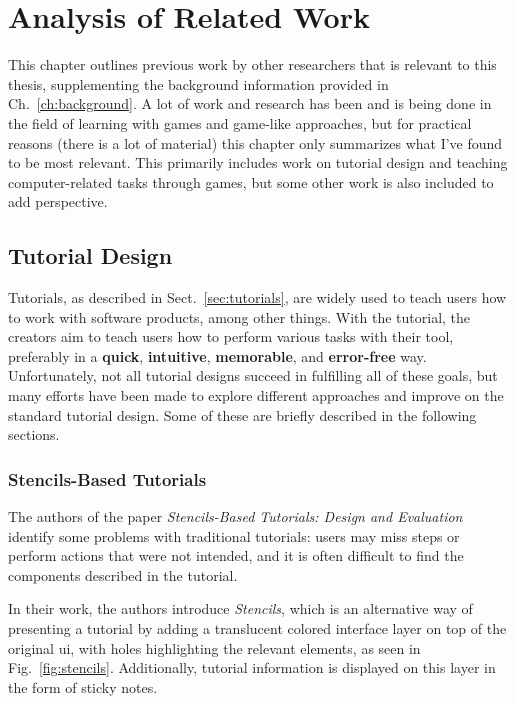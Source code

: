 \chapter{Analysis of Related Work}
\label{ch:related_work}
This chapter outlines previous work by other researchers that is relevant to this thesis, supplementing the background information provided in Ch.~\ref{ch:background}. A lot of work and research has been and is being done in the field of learning with games and game-like approaches, but for practical reasons (there is a lot of material) this chapter only summarizes what I've found to be most relevant. This primarily includes work on tutorial design and teaching computer-related tasks through games, but some other work is also included to add perspective.

\section{Tutorial Design}
\label{sec:tutorial_design_related}
Tutorials, as described in Sect.~\ref{sec:tutorials}, are widely used to teach users how to work with software products, among other things. With the tutorial, the creators aim to teach users how to perform various tasks with their tool, preferably in a \textbf{quick}, \textbf{intuitive}, \textbf{memorable}, and \textbf{error-free} way. Unfortunately, not all tutorial designs succeed in fulfilling all of these goals, but many efforts have been made to explore different approaches and improve on the standard tutorial design. Some of these are briefly described in the following sections.

\subsection{Stencils-Based Tutorials}
\label{sec:stencils}
The authors of the paper \emph{Stencils-Based Tutorials: Design and Evaluation}~\cite{kelleher:stencils} identify some problems with traditional tutorials: users may miss steps or perform actions that were not intended, and it is often difficult to find the components described in the tutorial.

\noindent
In their work, the authors introduce \emph{Stencils}, which is an alternative way of presenting a tutorial by adding a translucent colored interface layer on top of the original \gls{ui}, with holes highlighting the relevant elements, as seen in Fig.~\ref{fig:stencils}. Additionally, tutorial information is displayed on this layer in the form of sticky notes.

